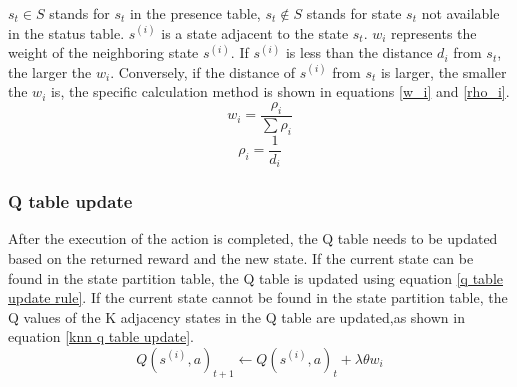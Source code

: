 \documentclass[twocolumn]{article}
\begin{document}
$s_{t}\in S$ stands for $s_{t}$ in the presence table, $s_{t}\notin S$ stands for state 
$s_{t}$ not available in the status table. $s^{(i)}$ is a state adjacent to the state 
$s_{t}$. $w_i$ represents the weight of the neighboring state $s^{(i)}$. If $s^{(i)}$ 
is less than the distance $d_i$ from $s_{t}$, the larger the $w_i$. Conversely, 
if the distance of $s^{(i)}$ from $s_{t}$ is larger, the smaller the $w_i$ is, the 
specific calculation method is shown in equations \ref{w_i} and \ref{rho_i}.
\begin{equation}
\label{w_i}
w_{i}=\frac{\rho _{i}}{\sum\rho_{i}}
\end{equation}
\begin{equation}
\label{rho_i}
\rho_{i}=\frac{1}{d_{i}}
\end{equation}
\subsubsection{Q table update}
After the execution of the action is completed, the Q table needs to be updated 
based on the returned reward and the new state. If the current state can be 
found in the state partition table, the Q table is updated using equation \ref{q table update rule}. 
If the current state cannot be found in the state partition table, the Q values 
of the K adjacency states in the Q table are updated,as shown in equation \ref{knn q table update}.
\begin{equation}
\label{knn q table update}
Q(s^{(i)},a)_{t+1}\leftarrow Q(s^{(i)},a)_{t}+\lambda\theta w_{i}
\end{equation}
\end{document}
